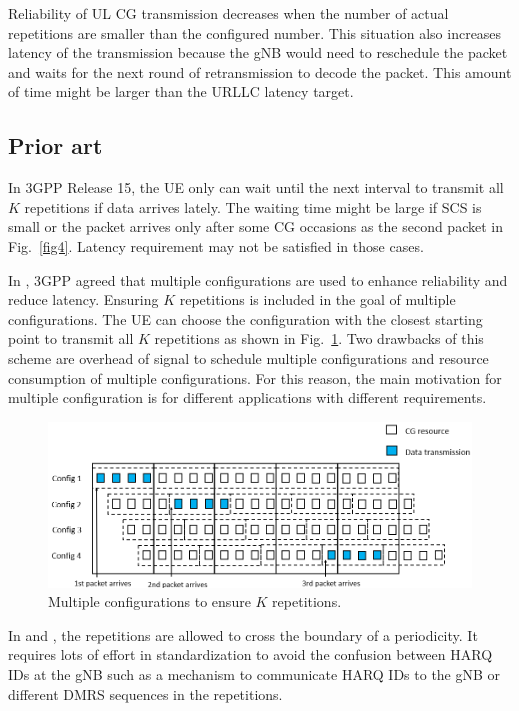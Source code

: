\documentclass{ieeeaccess}
\begin{document}
Reliability of UL CG transmission decreases when the number of actual repetitions are smaller than the configured number. This situation also increases latency of the transmission because the gNB would need to reschedule the packet and waits for the next round of retransmission to decode the packet. This amount of time might be larger than the URLLC latency target.

\subsection{Prior art}\label{IIIBN}
In 3GPP Release 15, the UE only can wait until the next interval to transmit all $K$ repetitions if data arrives lately. The waiting time might be large if SCS is small or the packet arrives only after some CG occasions as the second packet in Fig.~\ref{fig4}. Latency requirement may not be satisfied in those cases.

In \cite{ref7}, 3GPP agreed that multiple configurations are used to enhance reliability and reduce latency. Ensuring $K$ repetitions is included in the goal of multiple configurations. The UE can choose the configuration with the closest starting point to transmit all $K$ repetitions as shown in Fig.~\ref{fig14}. Two drawbacks of this scheme are overhead of signal to schedule multiple configurations and resource consumption of multiple configurations. For this reason, the main motivation for multiple configuration is for different applications with different requirements.

\begin{figure}[htbp]
\centerline{\includegraphics[scale=0.32]{fig14.PNG}}
\caption{Multiple configurations to ensure $K$ repetitions.}
\label{fig14}
\vspace{-4mm}
\end{figure}


In \cite{ref8} and \cite{ref9}, the repetitions are allowed to cross the boundary of a periodicity. It requires lots of effort in standardization to avoid the confusion between HARQ IDs at the gNB such as a mechanism to communicate HARQ IDs to the gNB or different DMRS sequences in the repetitions.
\end{document}
